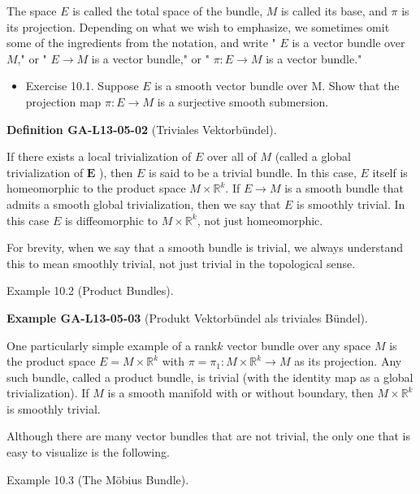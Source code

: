 \documentclass[10pt, letterpaper]{article}
\newcommand{\CustomHeading}[3]{%
  \par\medskip\noindent%
  \textbf{#1 #2} \textnormal{(#3)}.\enskip%
}
\newenvironment{DEF}[2]{\begin{unitbox}\CustomHeading{Definition}{#1}{#2}}{\end{unitbox}}
\newenvironment{EXA}[2]{\begin{unitbox}\CustomHeading{Example}{#1}{#2}}{\end{unitbox}}
\begin{document}
The space $E$ is called the total space of the bundle, $M$ is called its base, and $\pi$ is its projection. Depending on what we wish to emphasize, we sometimes omit some of the ingredients from the notation, and write " $E$ is a vector bundle over $M$," or " $E \rightarrow M$ is a vector bundle," or " $\pi: E \rightarrow M$ is a vector bundle."

\begin{itemize}
  \item Exercise 10.1. Suppose $E$ is a smooth vector bundle over M. Show that the projection map $\pi: E \rightarrow M$ is a surjective smooth submersion.
\end{itemize}

\begin{DEF}{GA-L13-05-02}{Triviales Vektorbündel}
If there exists a local trivialization of $E$ over all of $M$ (called a global trivialization of $\boldsymbol{E}$ ), then $E$ is said to be a trivial bundle. In this case, $E$ itself is homeomorphic to the product space $M \times \mathbb{R}^{k}$. If $E \rightarrow M$ is a smooth bundle that admits a smooth global trivialization, then we say that $E$ is smoothly trivial. In this case $E$ is diffeomorphic to $M \times \mathbb{R}^{k}$, not just homeomorphic.
\end{DEF}

For brevity, when we say that a smooth bundle is trivial, we always understand this to mean smoothly trivial, not just trivial in the topological sense.



Example 10.2 (Product Bundles). 


\begin{EXA}{GA-L13-05-03}{Produkt Vektorbündel als triviales Bündel}
One particularly simple example of a rank$k$ vector bundle over any space $M$ is the product space $E=M \times \mathbb{R}^k$ with $\pi=\pi_1: M \times \mathbb{R}^k \rightarrow M$ as its projection. Any such bundle, called a product bundle, is trivial (with the identity map as a global trivialization). If $M$ is a smooth manifold with or without boundary, then $M \times \mathbb{R}^k$ is smoothly trivial.
\end{EXA}


Although there are many vector bundles that are not trivial, the only one that is easy to visualize is the following.

Example 10.3 (The Möbius Bundle). 
\end{document}
